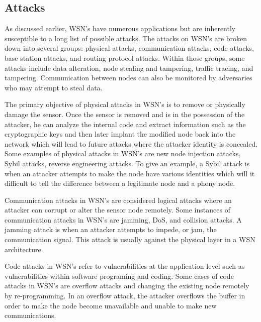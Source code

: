 \subsection {Attacks}

As discussed earlier, WSN’s have numerous applications but are inherently susceptible to a long list of possible attacks. The attacks on WSN’s are broken down into several groups: physical attacks, communication attacks, code attacks, base station attacks, and routing protocol attacks. Within those groups, some attacks include data alteration, node stealing and tampering, traffic tracing, and tampering. Communication between nodes can also be monitored by adversaries who may attempt to steal data. 

\smallskip

The primary objective of physical attacks in WSN’s is to remove or physically damage the sensor. Once the sensor is removed and is in the possession of the attacker, he can analyze the internal code and extract information such as the cryptographic keys and then later implant the modified node back into the network which will lead to future attacks where the attacker identity is concealed. Some examples of physical attacks in WSN’s are new node injection attacks, Sybil attacks, reverse engineering attacks. To give an example, a Sybil attack is when an attacker attempts to make the node have various identities which will it difficult to tell the difference between a legitimate node and a phony node.

\smallskip

Communication attacks in WSN’s are considered logical attacks where an attacker can corrupt or alter the sensor node remotely. Some instances of communication attacks in WSN’s are jamming, DoS, and collision attacks. A jamming attack is when an attacker attempts to impede, or jam, the communication signal. This attack is usually against the physical layer in a WSN architecture. 

\smallskip

Code attacks in WSN’s refer to vulnerabilities at the application level such as vulnerabilities within software programing and coding. Some cases of code attacks in WSN’s are overflow attacks and changing the existing node remotely by re-programming. In an overflow attack, the attacker overflows the buffer in order to make the node become unavailable and unable to make new communications. 

\smallskip

